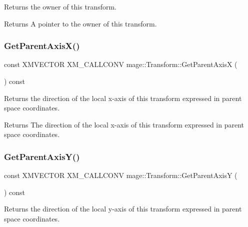 Returns the owner of this transform.

\begin{DoxyReturn}{Returns}
A pointer to the owner of this transform. 
\end{DoxyReturn}
\mbox{\label{classmage_1_1_transform_a0a99aa4625d2bfea0d0484f23bde0d65}} 
\subsubsection{\texorpdfstring{Get\+Parent\+Axis\+X()}{GetParentAxisX()}}
{\footnotesize\ttfamily const X\+M\+V\+E\+C\+T\+OR X\+M\+\_\+\+C\+A\+L\+L\+C\+O\+NV mage\+::\+Transform\+::\+Get\+Parent\+AxisX (\begin{DoxyParamCaption}{ }\end{DoxyParamCaption}) const\hspace{0.3cm}{\ttfamily [noexcept]}}

Returns the direction of the local x-\/axis of this transform expressed in parent space coordinates.

\begin{DoxyReturn}{Returns}
The direction of the local x-\/axis of this transform expressed in parent space coordinates. 
\end{DoxyReturn}
\mbox{\label{classmage_1_1_transform_a81c1514a624946249e9c7ec65871b599}} 
\subsubsection{\texorpdfstring{Get\+Parent\+Axis\+Y()}{GetParentAxisY()}}
{\footnotesize\ttfamily const X\+M\+V\+E\+C\+T\+OR X\+M\+\_\+\+C\+A\+L\+L\+C\+O\+NV mage\+::\+Transform\+::\+Get\+Parent\+AxisY (\begin{DoxyParamCaption}{ }\end{DoxyParamCaption}) const\hspace{0.3cm}{\ttfamily [noexcept]}}

Returns the direction of the local y-\/axis of this transform expressed in parent space coordinates.

